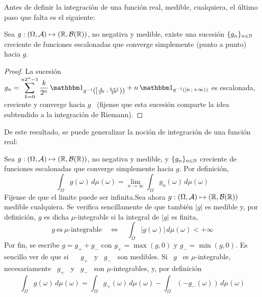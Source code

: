 Antes de definir la integraci\'on de una funci\'on real, medible, cualquiera, el
\'ultimo paso que falta es el siguiente:
%
\begin{teorema}\label{Th:MP:MedibleLimite}
  Sea $g: (\Omega,\mathcal{A}) \mapsto  (\mathbb{R},\mathcal{B}(\mathbb{R}))$, no negativa y medible, existe
  una sucesi\'on  $\{ g_n \}_{n  \in \mathbb{N}}$ creciente de  funciones escalonadas
  que converge simplemente (punto a punto) hacia $g$.
\end{teorema}
%
\begin{proof}
  La  sucesi\'on  $\displaystyle g_n  =  \sum_{k=0}^{n  2^n-1} \frac{k}{2^n}  \,
  \un_{g^{-1}\left(  \left[  \frac{k}{2^n}   \,  ;  \,  \frac{k+1}{2^n}  \right)
    \right)} + n \, \un_{g^{-1}\left( \left[ n \, ; \, +\infty \right) \right)}$
  es escalonada, creciente  y converge hacia $g$ \  (fijense que esta sucesi\'on
  comparte la idea subtendido a la integraci\'on de Riemann).
\end{proof}

De  este resultado, se  puede generalizar  la noci\'on  de integraci\'on  de una
funci\'on real:
%
\begin{definicion}\label{Def:MP:IntegracionReal}
  Sea $g: (\Omega,\mathcal{A})  \mapsto (\mathbb{R},\mathcal{B}(\mathbb{R}))$, no negativa y  medible, y $\{
  g_n  \}_{n  \in  \mathbb{N}}$  creciente  de  funciones  escalonadas  que  converge
  simplemente hacia $g$. Por definici\'on,
  \[
  \int_{\Omega}  g(\omega) \,  d\mu(\omega)  = \lim_{n  \to \infty}  \int_\Omega
  g_n(\omega) \, d\mu(\omega)
  \]
  Fijense de que el limite puede ser infinita.\newline Sea ahora $g: (\Omega,\mathcal{A})
  \mapsto (\mathbb{R},\mathcal{B}(\mathbb{R}))$  medible cualquiera.  Se  verifica sencillamente de
  que  tambi\'en   $|g|$  es   medible  y,  por   definici\'on,  $g$   es  dicha
  $\mu$-integrable si la integral de $|g|$ es finita,
  \[
  g   \:  \mbox{es}   \:  \mu\mbox{-integrable}   \quad   \Leftrightarrow  \quad
  \int_\Omega |g(\omega)| \, d\mu(\omega) < +\infty
  \]
  Por  fin,  se escribe  $g  =  g_+  + g_-$  con  $g_+  =  \max(g,0)$ y  $g_-  =
  \min(g,0)$. Es sencillo ver de que si  \  \ $g_+$ \ y
  \ $g_-$ \ son medibles. Si \ $g$ \ es $\mu$-integrable, necesariamente \ $g_+$
  \ y \ $g_-$ \ son $\mu$-integrables, y, por definici\'on
  \[
  \int_\Omega   g(\omega)   \,  d\mu(\omega)   =   \int_\Omega  g_+(\omega)   \,
  d\mu(\omega) - \int_\Omega \left( - g_-(\omega) \right) \, d\mu(\omega)
  \]
\end{definicion}

